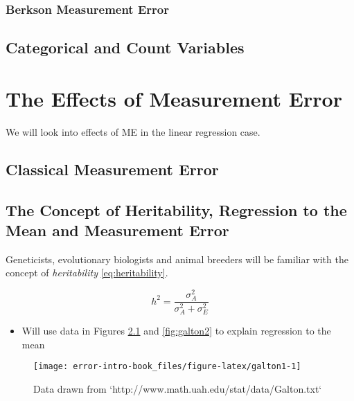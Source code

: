 \documentclass[]{book}
\providecommand{\tightlist}{%
  \setlength{\itemsep}{0pt}\setlength{\parskip}{0pt}}
\theoremstyle{definition}
\theoremstyle{definition}
\theoremstyle{definition}
\theoremstyle{remark}
\begin{document}
\subsection{Berkson Measurement Error}\label{berkson-measurement-error}

\section{Categorical and Count
Variables}\label{categorical-and-count-variables}

\chapter{The Effects of Measurement
Error}\label{the-effects-of-measurement-error}

We will look into effects of ME in the linear regression case.

\section{Classical Measurement
Error}\label{classical-measurement-error-1}

\section{The Concept of Heritability, Regression to the Mean and
Measurement Error}\label{sec:heritability}

Geneticists, evolutionary biologists and animal breeders will be
familiar with the concept of \emph{heritability} \eqref{eq:heritability}.

\begin{equation}
h^2 = \frac{\sigma_A^2}{\sigma_A^2 + \sigma_E^2}
\label{eq:heritability}
\end{equation}

\begin{itemize}
\tightlist
\item
  Will use data in Figures \ref{fig:galton1} and \ref{fig:galton2} to
  explain regression to the mean
\end{itemize}

\begin{figure}

{\centering \texttt{[image: error-intro-book\_files/figure-latex/galton1-1]} 

}

\caption{Data drawn from `http://www.math.uah.edu/stat/data/Galton.txt`}\label{fig:galton1}
\end{figure}
\end{document}
